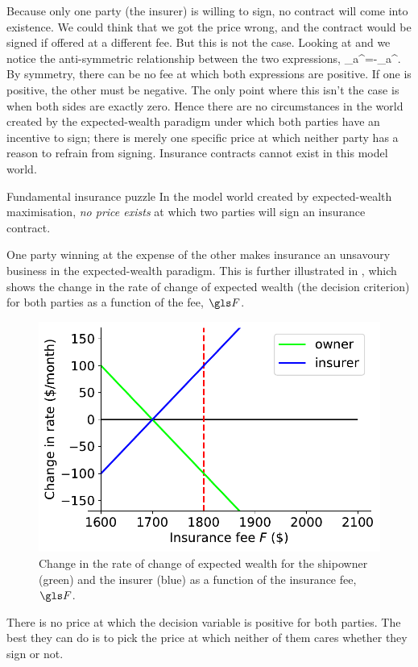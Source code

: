 Because only one party (the insurer) is willing to sign, no contract will come into existence. We could think that we got
the price wrong, and the contract would be signed if offered at a different fee. 
But this is not the case. Looking at  and  we notice the anti-symmetric 
relationship between the two expressions, 
\be
\delta\gt_a^=-\delta\gt_a^.
\ee
By symmetry, there can be no fee at which both expressions are positive. 
If one is positive, the other must be negative. The only point where this
isn't the case is when both sides are exactly zero.
Hence there are no circumstances in the world created by the 
expected-wealth paradigm under which both parties have an incentive to 
sign; there is merely one specific price at which neither party has a reason 
to refrain from signing. Insurance contracts cannot exist in this model world.

\begin{keypts}{Fundamental insurance puzzle}
In the model world created by expected-wealth maximisation, {\it no price exists} at 
which two parties will sign an insurance contract.
\end{keypts}

One party winning at the expense of the other makes insurance an 
unsavoury business in the expected-wealth paradigm. This is further 
illustrated in , which shows the change in the rate of 
change of expected wealth (the decision criterion) for both parties 
as a function of the fee, $\F$.
\begin{figure}
\centering
\includegraphics[width=.5\textwidth]{./chapter_real/figs/insurance_exp.pdf}
\caption{Change in the rate of change of expected wealth for the shipowner (green) and the 
insurer (blue) as a function of the insurance fee, $\F$.}
\end{figure}
There is no price at which the decision variable is positive for both parties. The best they can 
do is to pick the price at which neither of them cares whether they sign or not.


